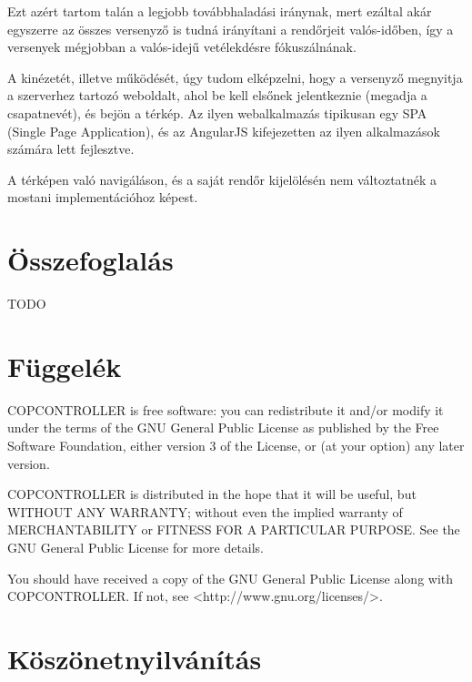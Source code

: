 \documentclass[a4paper,12pt]{report}
\begin{document}
\vspace{2mm}
Ezt azért tartom talán a legjobb továbbhaladási iránynak, mert ezáltal akár egyszerre az összes versenyző is tudná irányítani a rendőrjeit valós-időben, így a versenyek mégjobban a valós-idejű vetélekdésre fókuszálnának.

\vspace{2mm}
A kinézetét, illetve működését, úgy tudom elképzelni, hogy a versenyző megnyitja a szerverhez tartozó weboldalt, ahol be kell elsőnek jelentkeznie (megadja a csapatnevét), és bejön a térkép. Az ilyen webalkalmazás tipikusan egy SPA (Single Page Application), és az AngularJS kifejezetten az ilyen alkalmazások számára lett fejlesztve.

\vspace{2mm}
A térképen való navigáláson, és a saját rendőr kijelölésén nem változtatnék a mostani implementációhoz képest.

\newpage
\chapter{Összefoglalás}
\label{summary}

TODO

\newpage
{}

\begin{singlespace}

\end{singlespace}

\chapter*{Függelék}

\noindent
COPCONTROLLER is free software: you can redistribute it and/or modify
it under the terms of the GNU General Public License as published by
the Free Software Foundation, either version 3 of the License, or
(at your option) any later version.

\noindent
COPCONTROLLER is distributed in the hope that it will be useful,
but WITHOUT ANY WARRANTY; without even the implied warranty of
MERCHANTABILITY or FITNESS FOR A PARTICULAR PURPOSE.  See the
GNU General Public License for more details.

\noindent
You should have received a copy of the GNU General Public License
along with COPCONTROLLER. If not, see <http://www.gnu.org/licenses/>.

\chapter*{Köszönetnyilvánítás}
\end{document}
